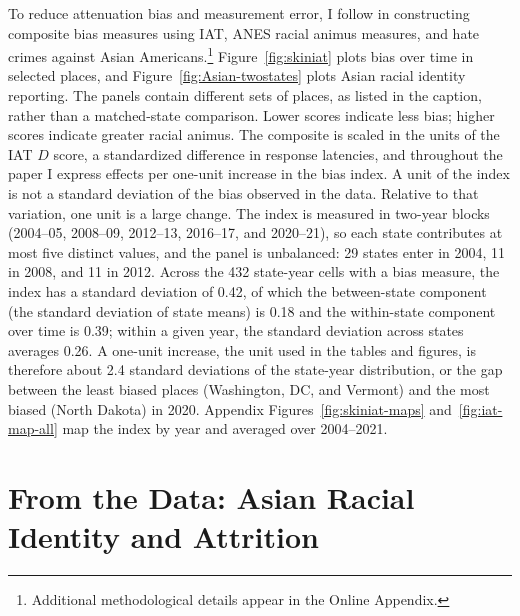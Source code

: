 To reduce attenuation bias and measurement error, I follow \textcite{lubotskyInterpretationRegressionsMultiple2006} in constructing composite bias measures using IAT, ANES racial animus measures, and hate crimes against Asian Americans.\footnote{Additional methodological details appear in the Online Appendix.} Figure~\ref{fig:skiniat} plots bias over time in selected places, and Figure~\ref{fig:Asian-twostates} plots Asian racial identity reporting. The panels contain different sets of places, as listed in the caption, rather than a matched-state comparison. Lower scores indicate less bias; higher scores indicate greater racial animus. The composite is scaled in the units of the IAT $D$ score, a standardized difference in response latencies, and throughout the paper I express effects per one-unit increase in the bias index. A unit of the index is not a standard deviation of the bias observed in the data. Relative to that variation, one unit is a large change. The index is measured in two-year blocks (2004--05, 2008--09, 2012--13, 2016--17, and 2020--21), so each state contributes at most five distinct values, and the panel is unbalanced: 29 states enter in 2004, 11 in 2008, and 11 in 2012. Across the 432 state-year cells with a bias measure, the index has a standard deviation of 0.42, of which the between-state component (the standard deviation of state means) is 0.18 and the within-state component over time is 0.39; within a given year, the standard deviation across states averages 0.26. A one-unit increase, the unit used in the tables and figures, is therefore about 2.4 standard deviations of the state-year distribution, or the gap between the least biased places (Washington, DC, and Vermont) and the most biased (North Dakota) in 2020. Appendix Figures~\ref{fig:skiniat-maps} and~\ref{fig:iat-map-all} map the index by year and averaged over 2004--2021.

\section{From the Data: Asian Racial Identity and Attrition}\label{sec:attrition}

